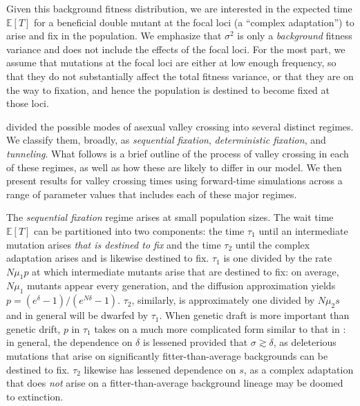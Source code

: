 \documentclass[10pt,twocolumn,twoside]{gsajnl}
\begin{document}
\begin{spacing}{1.5}
Given this background fitness distribution, we are interested in the expected time $\mathbb{E}\left[ T\right]$ for a beneficial double mutant at the focal loci (a ``complex adaptation'') to arise and fix in the population.
We emphasize that $\sigma^2$ is only a \emph{background} fitness variance and does not include the effects of the focal loci.
For the most part, we assume that mutations at the focal loci are either at low enough frequency, so that they do not substantially affect the total fitness variance, or that they are on the way to fixation, and hence the population is destined to become fixed at those loci.

\citet{weissman_2009} divided the possible modes of asexual valley crossing into several distinct regimes.
We classify them, broadly, as \emph{sequential fixation}, \emph{deterministic fixation}, and \emph{tunneling}.
What follows is a brief outline of the process of valley crossing in each of these regimes, as well as how these are likely to differ in our model.
We then present results for valley crossing times using forward-time simulations across a range of parameter values that includes each of these major regimes.

The \emph{sequential fixation} regime arises at small population sizes.
The wait time $\mathbb{E}\left[ T\right]$ can be partitioned into two components: the time $\tau_1$ until an intermediate mutation arises \emph{that is destined to fix} and the time $\tau_2$ until the complex adaptation arises and is likewise destined to fix.
$\tau_1$ is one divided by the rate $N\mu_1 p$ at which intermediate mutants arise that are destined to fix: on average, $N\mu_1$ mutants appear every generation, and the diffusion approximation yields $p = (e^\delta - 1)/(e^{N\delta} - 1)$.
$\tau_2$, similarly, is approximately one divided by $N\mu_2 s$ and in general will be dwarfed by $\tau_1$.
When genetic draft is more important than genetic drift, $p$ in $\tau_1$ takes on a much more complicated form similar to that in \citet{good_desai_2014}: in general, the dependence on $\delta$ is lessened provided that $\sigma \gtrsim \delta$, as deleterious mutations that arise on significantly fitter-than-average backgrounds can be destined to fix.
$\tau_2$ likewise has lessened dependence on $s$, as a complex adaptation that does \emph{not} arise on a fitter-than-average background lineage may be doomed to extinction.



\end{spacing}
\end{document}

